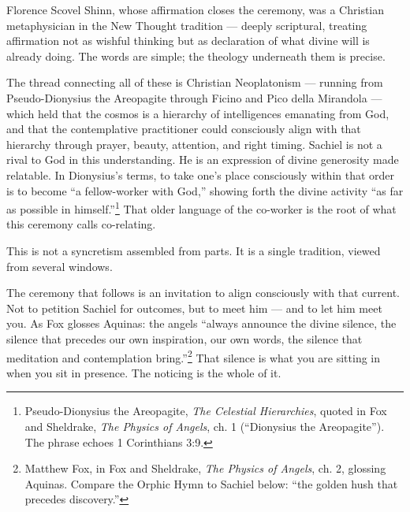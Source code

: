 \documentclass[10pt,openany]{book}
\begin{document}
{\vspace{6pt}
\noindent Florence Scovel Shinn, whose affirmation closes the ceremony, was a Christian
metaphysician in the New Thought tradition --- deeply scriptural, treating affirmation not
as wishful thinking but as declaration of what divine will is already doing. The words are
simple; the theology underneath them is precise.

\vspace{6pt}
\noindent The thread connecting all of these is Christian Neoplatonism --- running from
Pseudo-Dionysius the Areopagite through Ficino and Pico della Mirandola --- which held that
the cosmos is a hierarchy of intelligences emanating from God, and that the contemplative
practitioner could consciously align with that hierarchy through prayer, beauty, attention,
and right timing. Sachiel is not a rival to God in this understanding. He is an expression
of divine generosity made relatable. In Dionysius's terms, to take one's place consciously
within that order is to become ``a fellow-worker with God,'' showing forth the divine
activity ``as far as possible in himself.''\footnote{Pseudo-Dionysius the Areopagite,
\textit{The Celestial Hierarchies}, quoted in Fox and Sheldrake, \textit{The Physics of
Angels}, ch. 1 (``Dionysius the Areopagite''). The phrase echoes 1 Corinthians 3:9.} That
older language of the co-worker is the root of what this ceremony calls co-relating.

\vspace{6pt}
\noindent This is not a syncretism assembled from parts. It is a single tradition, viewed
from several windows.

\vspace{10pt}
\noindent The ceremony that follows is an invitation to align consciously with that current.
Not to petition Sachiel for outcomes, but to meet him --- and to let him meet you. As Fox
glosses Aquinas: the angels ``always announce the divine silence, the silence that precedes
our own inspiration, our own words, the silence that meditation and contemplation
bring.''\footnote{Matthew Fox, in Fox and Sheldrake, \textit{The Physics of Angels}, ch. 2,
glossing Aquinas. Compare the Orphic Hymn to Sachiel below: ``the golden hush that precedes
discovery.''} That silence is what you are sitting in when you sit in presence. The noticing
is the whole of it.

}

\end{document}

